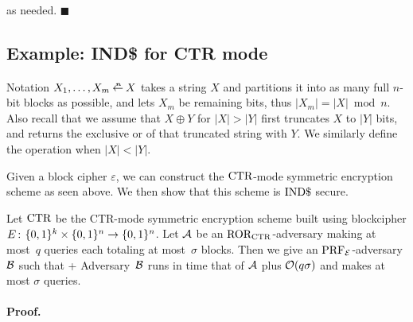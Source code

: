 as needed. $\blacksquare$

\subsection{Example: IND\$ for CTR mode}


Notation $X_1,\ldots,X_m \getparse{n} X$ takes a string $X$ and partitions it
into as many full $n$-bit blocks as possible, and lets $X_m$ be remaining bits,
thus $|X_m| = |X| \bmod n$. Also recall that we assume that  $X \oplus Y$ for
$|X| > |Y|$ 
first truncates $X$ to $|Y|$ bits, and returns the exclusive or of that
truncated string with $Y$. We similarly define the operation when $|X| < |Y|$.

Given a block cipher $\varepsilon$, we can construct the $\textnormal{CTR}$-mode
symmetric encryption scheme as seen above. We then show that
this scheme is $\textnormal{IND\$}$ secure.

\begin{theorem*}
Let $\textnormal{CTR}$ be the CTR-mode symmetric encryption scheme built using blockcipher
$E{{\kern .05em}\colon{\kern .05em}}\{0,1\}^k\times\{0,1\}^n\rightarrow\{0,1\}^n$. Let ${\mathcal A}$ be an
$\textnormal{ROR}_{\textnormal{CTR}}$-adversary making at most~$q$ queries each totaling at most~$\sigma$
blocks. Then we give an $\textnormal{PRF}_{\cal E}$-adversary ${\mathcal B}$ such
that
\bnm
  \AdvROR{\CTR}{\advA} \le \AdvPRF{\cipher}{\advB} + 
\enm
Adversary~${\mathcal B}$ runs in time that of ${\mathcal A}$ plus ${\cal O}(q\sigma)$ and makes at most
$\sigma$ queries.
\end{theorem*}

\paragraph{Proof.}

